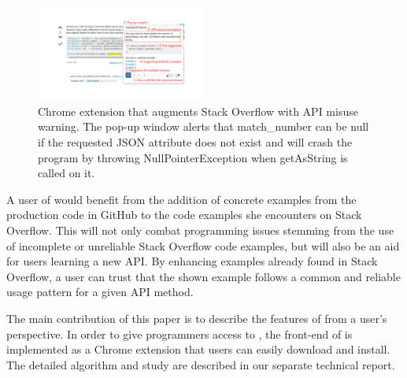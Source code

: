 \begin{figure}
\centering
\includegraphics[width=0.5\textwidth]{soap-v3.pdf}
  \vspace{.1in}
  \caption{{\tool} Chrome extension that augments Stack Overflow with API misuse warning. The pop-up window alerts that {\ttt match\_number} can be {\ttt null} if the requested {\ttt JSON} attribute does not exist and will crash the program by throwing {\ttt NullPointerException} when {\ttt getAsString} is called on it.\protect\footnotemark}
  \label{fig:screenshot}
\end{figure}


A user of {\tool} would benefit from the addition of concrete examples from the production code in GitHub  to the code examples she encounters on Stack Overflow. This will not only combat programming issues stemming from the use of incomplete or unreliable Stack Overflow code examples, but will also be an aid for users learning a new API. By enhancing examples already found in Stack Overflow, a user can trust that the shown example follows a common and reliable usage pattern for a given API method.

The main contribution of this paper is to describe the features of {\tool} from a user's perspective. In order to give programmers access to {\tool}, the front-end of {\tool} is implemented as a Chrome extension that users can easily download and install. The detailed algorithm and study are described in our separate technical report.

%
